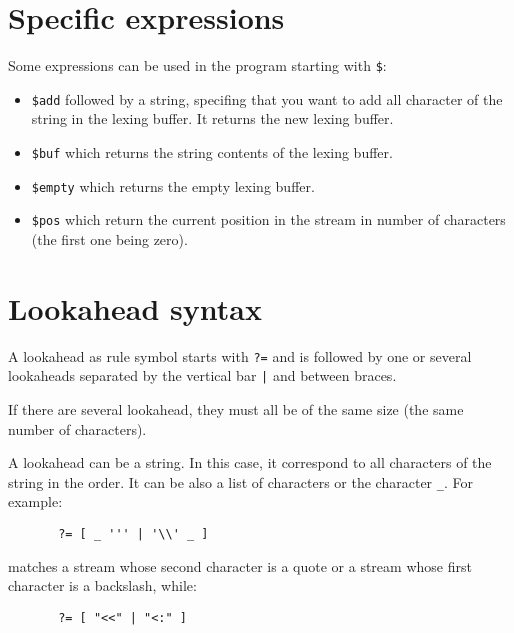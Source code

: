 \documentclass[11pt]{article}
\begin{document}
\section{Specific expressions}

Some expressions can be used in the program starting with \verb/$/:

\begin{itemize}

\item \verb/$add/ followed by a string, specifing that you want to add
  all character of the string in the lexing buffer. It returns the new
  lexing buffer.

\item \verb/$buf/ which returns the string contents of the lexing buffer.

\item \verb/$empty/ which returns the empty lexing buffer.

\item \verb/$pos/ which return the current position in the stream in
  number of characters (the first one being zero).

\end{itemize}

\section{Lookahead syntax}

A lookahead as rule symbol starts with \verb/?=/ and is followed by
one or several lookaheads separated by the vertical bar \verb/|/ and
between braces.

If there are several lookahead, they must all be of the same size (the
same number of characters).

A lookahead can be a string. In this case, it correspond to all characters
of the string in the order. It can be also a list of characters or the
character \verb/_/. For example:

\begin{verbatim}
       ?= [ _ ''' | '\\' _ ]
\end{verbatim}

matches a stream whose second character is a quote or a stream whose
first character is a backslash, while:

\begin{verbatim}
       ?= [ "<<" | "<:" ]
\end{verbatim}
\end{document}
